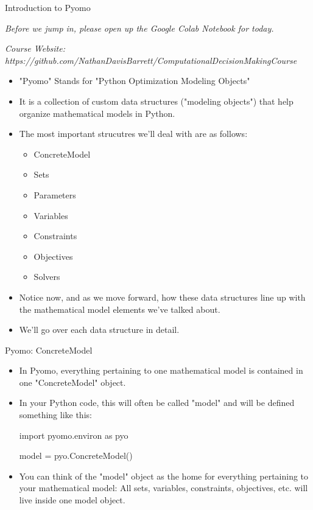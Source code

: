 \documentclass[10pt, aspectratio=169]{beamer}
\begin{document}
\begin{frame}{Introduction to Pyomo}
    \begin{center}
        \textit{Before we jump in, please open up the Google Colab Notebook for today.}

        \textit{Course Website: https://github.com/NathanDavisBarrett/ComputationalDecisionMakingCourse}
    \end{center}

    \begin{itemize}
        \item "Pyomo" Stands for "Python Optimization Modeling Objects"
        \item It is a collection of custom data structures ("modeling objects") that help organize mathematical models in Python.
        \item The most important strucutres we'll deal with are as follows:
        \begin{itemize}
            \item ConcreteModel
            \item Sets
            \item Parameters
            \item Variables
            \item Constraints
            \item Objectives
            \item Solvers
        \end{itemize}
        \item Notice now, and as we move forward, how these data structures line up with the mathematical model elements we've talked about.
        \item We'll go over each data structure in detail.
    \end{itemize}
\end{frame}

\begin{frame}{Pyomo: ConcreteModel}
    \begin{itemize}
        \item In Pyomo, everything pertaining to one mathematical model is contained in one "ConcreteModel" object.
        \item In your Python code, this will often be called "model" and will be defined something like this:
        
        \hspace{0.25cm} import pyomo.environ as pyo

        \vspace{0.25cm}
        
        \hspace{0.25cm} model = pyo.ConcreteModel()

        \item You can think of the "model" object as the home for everything pertaining to your mathematical model: All sets, variables, constraints, objectives, etc. will live inside one model object.
    \end{itemize}
\end{frame}
\end{document}
